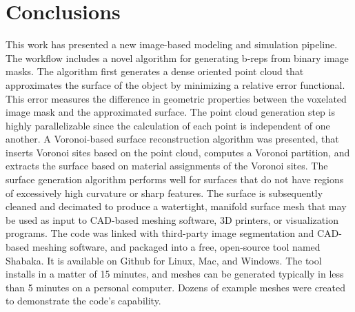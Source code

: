 \chapter{Conclusions}
\label{chap:7}
%

This work has presented a new image-based modeling and simulation pipeline. The workflow includes a novel algorithm for generating b-reps from binary image masks. The algorithm first generates a dense oriented point cloud that approximates the surface of the object by minimizing a relative error functional. This error measures the difference in geometric properties between the voxelated image mask and the approximated surface. The point cloud generation step is highly parallelizable since the calculation of each point is independent of one another. A Voronoi-based surface reconstruction algorithm was presented, that inserts Voronoi sites based on the point cloud, computes a Voronoi partition, and extracts the surface based on material assignments of the Voronoi sites. The surface generation algorithm performs well for surfaces that do not have regions of excessively high curvature or sharp features. The surface is subsequently cleaned and decimated to produce a watertight, manifold surface mesh that may be used as input to CAD-based meshing software, 3D printers, or visualization programs. The code was linked with third-party image segmentation and CAD-based meshing software, and packaged into a free, open-source tool named Shabaka. It is available on Github for Linux, Mac, and Windows. The tool installs in a matter of 15 minutes, and meshes can be generated typically in less than 5 minutes on a personal computer. Dozens of example meshes were created to demonstrate the code's capability.

